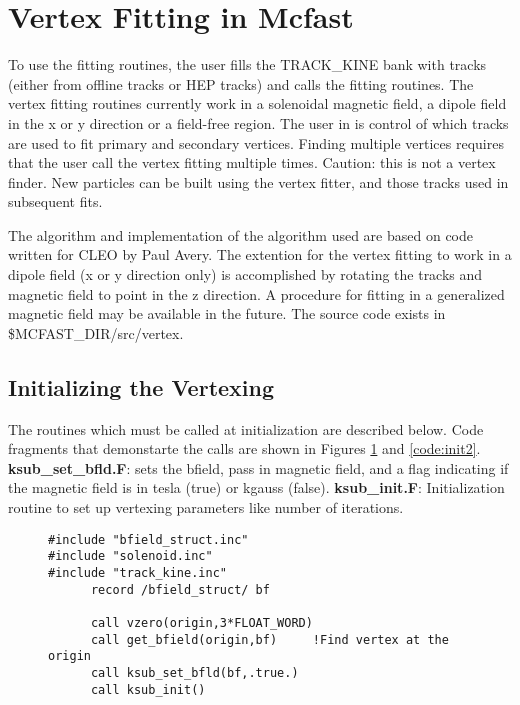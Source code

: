 \def\nextline{\unskip\nobreak\hfill\break}
\pagestyle{empty}

\topskip 2cm 

\section{Vertex Fitting in Mcfast}

To use the fitting routines, the user fills the {\small TRACK\_KINE} bank with
tracks (either from offline tracks or {\small HEP tracks}) and calls the fitting
routines.  The vertex fitting routines currently work in a solenoidal 
magnetic field, a dipole field in the x or y direction or a field-free region.  
The user in is control of which tracks are used to fit primary and secondary
vertices.  Finding multiple vertices requires that the user call the vertex
fitting multiple times.  Caution: this is not a vertex finder.
New particles can be built using the vertex fitter, and those tracks used in
subsequent fits.

The algorithm and implementation of the algorithm used are based on code 
written for CLEO by Paul Avery\cite{Avery}.  The extention for the vertex
fitting to work in a dipole field (x or y direction only) is accomplished by
rotating the tracks and magnetic field to point in the z direction.  A
procedure for fitting in a generalized magnetic field may be available in the
future.
The source code exists in \$MCFAST\_DIR/src/vertex.

\subsection{Initializing the Vertexing}

The routines which must be called at initialization are described below. 
Code fragments that demonstarte the calls are shown in Figures \ref{code:init1}
and \ref{code:init2}.\nextline\nextline
{\bf ksub\_set\_bfld.F}:  sets the bfield, pass in magnetic field, and a flag 
                    indicating if the magnetic field is in tesla (true) 
                    or kgauss (false).\nextline\nextline
{\bf ksub\_init.F}:     Initialization routine to set up vertexing
                        parameters like number of iterations.\nextline


\begin{figure}
\begin{tt}
\begin{verbatim}
#include "bfield_struct.inc"
#include "solenoid.inc"
#include "track_kine.inc"
      record /bfield_struct/ bf
      
      call vzero(origin,3*FLOAT_WORD)  
      call get_bfield(origin,bf)     !Find vertex at the origin
      call ksub_set_bfld(bf,.true.)           
      call ksub_init()
\end{verbatim}
\end{tt}
\label{code:init1}
\end{figure}

